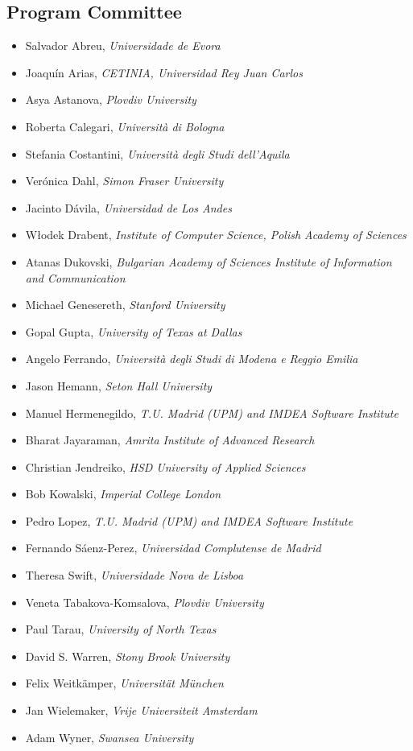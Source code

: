 \documentclass[
]{ceurart}
\begin{document}
\subsection*{Program Committee}
\begin{itemize}
\item Salvador Abreu, \emph{Universidade de Evora}
\item Joaquín Arias, \emph{CETINIA, Universidad Rey Juan Carlos}
\item Asya Astanova, \emph{Plovdiv University}
\item Roberta Calegari, \emph{Università di Bologna}
\item Stefania Costantini, \emph{Università degli Studi dell'Aquila}
\item Verónica Dahl, \emph{Simon Fraser University}
\item Jacinto Dávila, \emph{Universidad de Los Andes}
\item Włodek Drabent, \emph{Institute of Computer Science, Polish Academy of Sciences}
\item Atanas Dukovski, \emph{Bulgarian Academy of Sciences Institute of Information and Communication}
\item Michael Genesereth, \emph{Stanford University}
\item Gopal Gupta, \emph{University of Texas at Dallas}
\item Angelo Ferrando, \emph{Università degli Studi di Modena e Reggio Emilia}
\item Jason Hemann, \emph{Seton Hall University}
\item Manuel Hermenegildo, \emph{T.U. Madrid (UPM) and IMDEA Software Institute}
\item Bharat Jayaraman, \emph{Amrita Institute of Advanced Research}
\item Christian Jendreiko, \emph{HSD University of Applied Sciences}
\item Bob Kowalski, \emph{Imperial College London}
\item Pedro Lopez, \emph{T.U. Madrid (UPM) and IMDEA Software Institute}
\item Fernando Sáenz-Perez, \emph{Universidad Complutense de Madrid}
\item Theresa Swift, \emph{Universidade Nova de Lisboa}
\item Veneta Tabakova-Komsalova, \emph{Plovdiv University}
\item Paul Tarau, \emph{University of North Texas}
\item David S. Warren, \emph{Stony Brook University}
\item Felix Weitkämper, \emph{Universität München}
\item Jan Wielemaker, \emph{Vrije Universiteit Amsterdam}
\item Adam Wyner, \emph{Swansea University}
\end{itemize}
\end{document}

